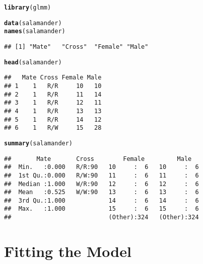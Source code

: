\documentclass[11pt]{article}\usepackage[]{graphicx}\usepackage[]{color}
\makeatletter
\newcommand{\hlstd}[1]{\textcolor[rgb]{0.345,0.345,0.345}{#1}}%
\newcommand{\hlkwd}[1]{\textcolor[rgb]{0.737,0.353,0.396}{\textbf{#1}}}%
\newenvironment{kframe}{%
 \def\at@end@of@kframe{}%
 \ifinner\ifhmode%
  \def\at@end@of@kframe{\end{minipage}}%
  \begin{minipage}{\columnwidth}%
 \fi\fi%
 \def\FrameCommand##1{\hskip\@totalleftmargin \hskip-\fboxsep
 \colorbox{shadecolor}{##1}\hskip-\fboxsep
     \hskip-\linewidth \hskip-\@totalleftmargin \hskip\columnwidth}%
 \MakeFramed {\advance\hsize-\width
   \@totalleftmargin\z@ \linewidth\hsize
   \@setminipage}}%
 {\par\unskip\endMakeFramed%
 \at@end@of@kframe}
\newenvironment{knitrout}{}{} %
\makeatother
\begin{document}
\begin{knitrout}
\color{fgcolor}\begin{kframe}
\begin{alltt}
\hlkwd{library}\hlstd{(glmm)}
\end{alltt}


{\ttfamily\noindent\itshape\color{messagecolor}{\#\# Loading required package: trust}}

{\ttfamily\noindent\itshape\color{messagecolor}{\#\# Loading required package: mvtnorm}}

{\ttfamily\noindent\itshape\color{messagecolor}{\#\# Loading required package: Matrix}}\begin{alltt}
\hlkwd{data}\hlstd{(salamander)}
\hlkwd{names}\hlstd{(salamander)}
\end{alltt}
\begin{verbatim}
## [1] "Mate"   "Cross"  "Female" "Male"
\end{verbatim}
\begin{alltt}
\hlkwd{head}\hlstd{(salamander)}
\end{alltt}
\begin{verbatim}
##   Mate Cross Female Male
## 1    1   R/R     10   10
## 2    1   R/R     11   14
## 3    1   R/R     12   11
## 4    1   R/R     13   13
## 5    1   R/R     14   12
## 6    1   R/W     15   28
\end{verbatim}
\begin{alltt}
\hlkwd{summary}\hlstd{(salamander)}
\end{alltt}
\begin{verbatim}
##       Mate       Cross        Female         Male    
##  Min.   :0.000   R/R:90   10     :  6   10     :  6  
##  1st Qu.:0.000   R/W:90   11     :  6   11     :  6  
##  Median :1.000   W/R:90   12     :  6   12     :  6  
##  Mean   :0.525   W/W:90   13     :  6   13     :  6  
##  3rd Qu.:1.000            14     :  6   14     :  6  
##  Max.   :1.000            15     :  6   15     :  6  
##                           (Other):324   (Other):324
\end{verbatim}
\end{kframe}
\end{knitrout}



\section{Fitting the Model}\label{sec:fitmod}
\end{document}
